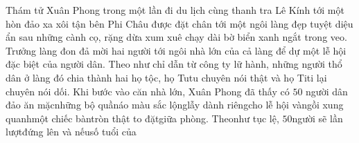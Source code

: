 \begin{multicols}{2}
	Thám tử Xuân Phong trong một lần đi du lịch cùng thanh tra Lê Kính tới một hòn đảo xa xôi tận bên Phi Châu được đặt chân tới một ngôi làng đẹp tuyệt diệu ẩn sau những cành cọ, rặng dừa xum xuê chạy dài bờ biển xanh ngắt trong veo. Trưởng làng đon đả mời hai người tới ngôi nhà lớn của cả làng để dự một lễ hội đặc biệt của người dân. Theo như chỉ dẫn từ công ty lữ hành, những người thổ dân ở làng đó chia thành hai họ tộc, họ Tutu chuyên nói thật và họ Titi lại chuyên nói dối. Khi bước vào căn nhà lớn, Xuân Phong đã thấy có $50$ người dân đảo ăn mặc\hspace*{123pt}\linebreak[6]những bộ quần\hspace*{123pt}\linebreak[6]áo màu sắc lộng\hspace*{123pt}\linebreak[6]lẫy dành riêng\hspace*{123pt}\linebreak[6]cho lễ hội và\hspace*{123pt}\linebreak[6]ngồi xung quanh\hspace*{123pt}\linebreak[6]một chiếc bàn\hspace*{123pt}\linebreak[6]tròn thật to đặt\hspace*{123pt}\linebreak[6]giữa phòng. Theo\hspace*{123pt}\linebreak[6]như tục lệ, $50$\hspace*{123pt}\linebreak[6]người sẽ lần lượt\hspace*{123pt}\linebreak[6]đứng lên và nếu\hspace*{123pt}\linebreak[6]số tuổi của 
\end{multicols}
